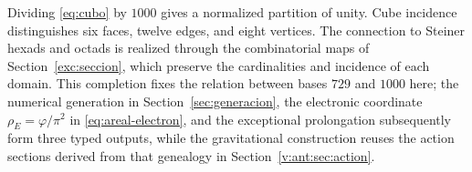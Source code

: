 Dividing \eqref{eq:cubo} by \(1000\) gives a normalized partition of unity. Cube incidence distinguishes six faces, twelve edges, and eight vertices. The connection to Steiner hexads and octads is realized through the combinatorial maps of Section~\ref{exc:seccion}, which preserve the cardinalities and incidence of each domain. This completion fixes the relation between bases \(729\) and \(1000\) here; the numerical generation in Section~\ref{sec:generacion}, the electronic coordinate \(\rho_E=\varphi/\pi^2\) in \eqref{eq:areal-electron}, and the exceptional prolongation subsequently form three typed outputs, while the gravitational construction reuses the action sections derived from that genealogy in Section~\ref{v:ant:sec:action}.





